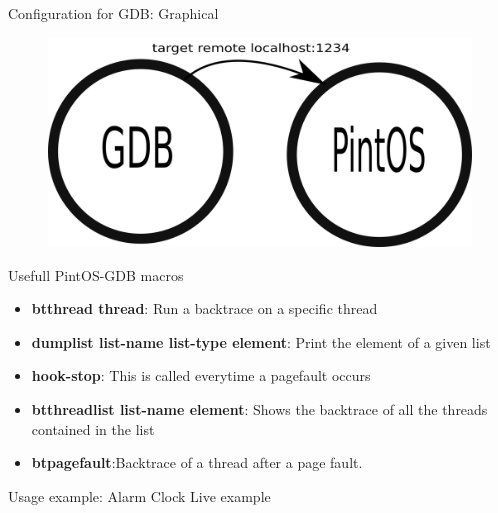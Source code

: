 \documentclass{beamer}
\begin{document}
\begin{frame}{Configuration for GDB: Graphical}
    \begin{figure}
        \centering
        \includegraphics[scale=0.2]{attach.png}
    \end{figure}
\end{frame}


\begin{frame}{Usefull PintOS-GDB macros}
	\begin{itemize}
    	\item \textbf{btthread thread}: Run a backtrace on a specific thread
    	\item \textbf{dumplist list-name list-type element}: Print the element of a given list
    	\item \textbf{hook-stop}: This is called everytime a pagefault occurs
    	\item \textbf{btthreadlist list-name element}: Shows the backtrace of all the threads contained in the list
    	\item \textbf{btpagefault}:Backtrace of a thread after a page fault.
	\end{itemize}
\end{frame}

\begin{frame}{Usage example: Alarm Clock}
    Live example
\end{frame}

\end{document}

